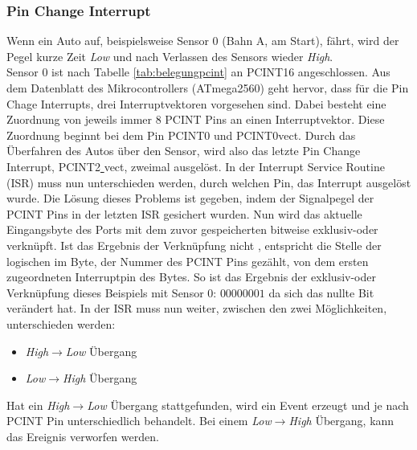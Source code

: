 \documentclass[a4paper, 11pt]{report}
\begin{document}
			\subsubsection {Pin Change Interrupt}\label{subsubsec:PCINT}
			Wenn ein Auto auf, beispielsweise Sensor 0 (Bahn A, am Start), fährt, wird der Pegel kurze Zeit \emph{Low} und nach Verlassen des Sensors wieder \emph{High}.\\ Sensor 0 ist nach Tabelle \ref{tab:belegungpcint} an PCINT16 angeschlossen. Aus dem Datenblatt des Mikrocontrollers (ATmega2560) geht hervor, dass für die Pin Chage Interrupts, drei Interruptvektoren vorgesehen sind. Dabei besteht eine Zuordnung von jeweils immer 8 PCINT Pins an einen Interruptvektor. Diese Zuordnung beginnt bei dem Pin PCINT0 und PCINT0\underline{}vect. Durch das Überfahren des Autos über den Sensor, wird also das letzte Pin Change Interrupt, PCINT2\underline{ }vect, zweimal ausgelöst. In der Interrupt Service Routine (ISR) muss nun unterschieden werden, durch welchen Pin, das Interrupt ausgelöst wurde.
			Die Lösung dieses Problems ist gegeben, indem der Signalpegel der PCINT Pins in der letzten ISR gesichert wurden. Nun wird das aktuelle Eingangsbyte des Ports mit dem zuvor gespeicherten bitweise exklusiv-oder verknüpft.
Ist das Ergebnis der Verknüpfung nicht \grqq, entspricht die Stelle der logischen \grqq im Byte, der Nummer des PCINT Pins gezählt, von dem ersten zugeordneten Interruptpin des Bytes. So ist das Ergebnis der exklusiv-oder Verknüpfung dieses Beispiels mit Sensor 0: $00000001$ da sich das nullte Bit verändert hat.
In der ISR muss nun weiter, zwischen den zwei Möglichkeiten, unterschieden werden:
				\begin{itemize}
					\item \emph{High$\rightarrow$Low} Übergang
					\item \emph{Low$\rightarrow$High} Übergang
				\end{itemize}
			Hat ein \emph{High$\rightarrow$Low} Übergang stattgefunden, wird ein Event erzeugt und je nach PCINT Pin unterschiedlich behandelt.
			Bei einem \emph{Low$\rightarrow$High} Übergang, kann das Ereignis verworfen werden.
\end{document}
